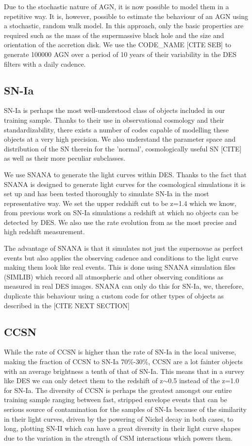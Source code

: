 Due to the stochastic nature of AGN, it is now possible to model them in a repetitive way. It is, however, possible to estimate the behaviour of an AGN using a stochastic, random walk model. In this approach, only the basic properties are required such as the mass of the supermassive black hole and the size and orientation of the accretion disk. We use the CODE\_NAME [CITE SEB] to generate 100000 AGN over a period of 10 years of their variability in the DES filters with a daily cadence.

\subsection{SN-Ia}
SN-Ia is perhaps the most well-understood class of objects included in our training sample. Thanks to their use in observational cosmology and their standardizability, there exists a number of codes capable of modelling these objects at a very high precision. We also understand the parameter space and distribution of the SN therein for the 'normal', cosmologically useful SN [CITE] as well as their more peculiar subclasses.

We use SNANA \citep{Kessler2010} to generate the light curves within DES. Thanks to the fact that SNANA is designed to generate light curves for the cosmological simulations it is set up and has been tested thoroughly to simulate SN-Ia in the most representative way. We set the upper redshift cut to be z=1.4 which we know, from previous work on SN-Ia simulations a redshift at which no objects can be detected by DES. We also use the rate evolution from \citet{Perrett2012} as the most precise and high redshift measurement.

The advantage of SNANA is that it simulates not just the supernovae as perfect events but also applies the observing cadence and conditions to the light curve making them look like real events. This is done using SNANA simulation files (SIMLIB) which record all atmospheric and other observing conditions as measured in real DES images. SNANA can only do this for SN-Ia, we, therefore, duplicate this behaviour using a custom code for other types of objects as described in the [CITE NEXT SECTION]

\subsection{CCSN}
While the rate of CCSN is higher than the rate of SN-Ia in the local universe, making the fraction of CCSN to SN-Ia 70\%-30\%, CCSN are a lot fainter objects with an average brightness a tenth of that of SN-Ia. This means that in a survey like DES we can only detect them to the redshift of z$\sim$0.5 instead of the z=1.0 for SN-Ia. The diversity of CCSN is perhaps the greatest amongst our entire training sample ranging between fast, stripped envelope events that can be serious source of contamination for the samples of SN-Ia because of the similarity in their light curves, driven by the powering of Nickel decay in both cases, to long, plotting SN-II which can have a great diversity in their light curve shapes due to the variation in the strength of CSM interactions which powers them.

